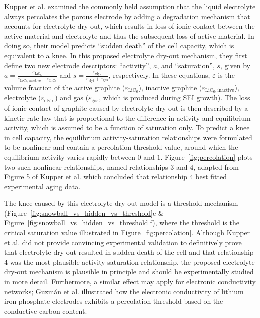 \documentclass[journal=jpclcd,manuscript=article]{achemso}
\begin{document}
Kupper et al.\cite{kupper_end--life_2018} examined the commonly held assumption that the liquid electrolyte always percolates the porous electrode by adding a degradation mechanism that accounts for electrolyte dry-out, which results in loss of ionic contact between the active material and electrolyte and thus the subsequent loss of active material. In doing so, their model predicts ``sudden death'' of the cell capacity, which is equivalent to a knee. In this proposed electrolyte dry-out mechanism, they first define two new electrode descriptors: ``activity'', $a$, and ``saturation'', $s$, given by $a = \frac{\varepsilon_{\text{LiC}_6}}{\varepsilon_{\text{LiC}_6,\text{inactive}}+\varepsilon_{\text{LiC}_6}}$ and $s = \frac{\varepsilon_\text{elyt}}{\varepsilon_\text{elyt}+\varepsilon_\text{gas}}$, respectively. In these equations, $\varepsilon$ is the volume fraction of the active graphite ($\varepsilon_{\text{LiC}_6}$), inactive graphite ($\varepsilon_{\text{LiC}_6,\text{inactive}}$), electrolyte ($\varepsilon_{\text{elyte}}$) and gas ($\varepsilon_{\text{gas}}$, which is produced during SEI growth). The loss of ionic contact of graphite caused by electrolyte dry-out is then described by a kinetic rate law that is proportional to the difference in activity and equilibrium activity, which is assumed to be a function of saturation only. To predict a knee in cell capacity, the equilibrium activity-saturation relationships were formulated to be nonlinear and contain a percolation threshold value, around which the equilibrium activity varies rapidly between $0$ and $1$. Figure~\ref{fig:percolation} plots two such nonlinear relationships, named relationships $3$ and $4$, adapted from Figure 5 of Kupper et al.\cite{kupper_end--life_2018} which concluded that relationship 4 best fitted experimental aging data.

The knee caused by this electrolyte dry-out model is a threshold mechanism (Figure~\ref{fig:snowball_vs_hidden_vs_threshold}c \& Figure~\ref{fig:snowball_vs_hidden_vs_threshold}f), where the threshold is the critical saturation value illustrated in Figure~\ref{fig:percolation}. Although Kupper et al.\cite{kupper_end--life_2018} did not provide convincing experimental validation to definitively prove that electrolyte dry-out resulted in sudden death of the cell and that relationship 4 was the most plausible activity-saturation relationship, the proposed electrolyte dry-out mechanism is plausible in principle and should be experimentally studied in more detail. Furthermore, a similar effect may apply for electronic conductivity networks; Guzmán et al. \cite{guzman_improved_2017} illustrated how the electronic conductivity of lithium iron phosphate electrodes exhibits a percolation threshold based on the conductive carbon content.
\end{document}

